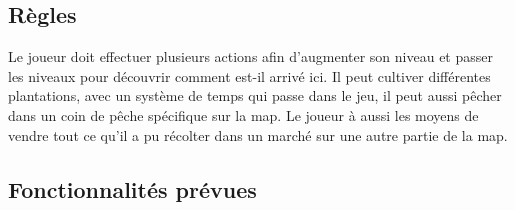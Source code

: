 \documentclass{article}
\begin{document}
\subsection{Règles}

Le joueur doit effectuer plusieurs actions afin d'augmenter son niveau et passer les niveaux pour découvrir comment est-il arrivé ici. Il peut cultiver différentes plantations, avec un système de temps qui passe dans le jeu, il peut aussi pêcher dans un coin de pêche spécifique sur la map. Le joueur à aussi les moyens de vendre tout ce qu'il a pu récolter dans un marché sur une autre partie de la map.%
\subsection{Fonctionnalités prévues}
\end{document}
